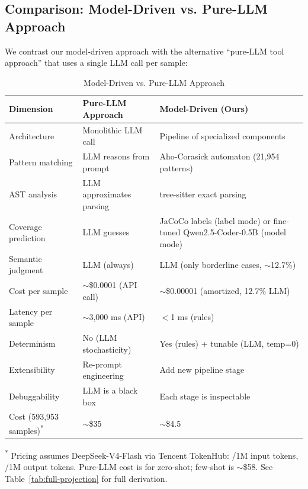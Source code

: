 \documentclass[acmlarge,nonacm,screen]{acmart}
\begin{document}
\subsection{Comparison: Model-Driven vs. Pure-LLM Approach}

We contrast our model-driven approach with the alternative ``pure-LLM tool approach'' that uses a single LLM call per sample:

\begin{table}[htbp]
\caption{Model-Driven vs. Pure-LLM Approach}
\label{tab:model-driven-vs-llm}
\begin{tabular}{@{}>{\raggedright\arraybackslash}p{3cm}>{\raggedright\arraybackslash}p{4.6cm}>{\raggedright\arraybackslash}p{5.6cm}@{}}
\toprule
\textbf{Dimension} & \textbf{Pure-LLM Approach} & \textbf{Model-Driven (Ours)} \\
\midrule
Architecture & Monolithic LLM call & Pipeline of specialized components \\
Pattern matching & LLM reasons from prompt & Aho-Corasick automaton (21,954 patterns) \\
AST analysis & LLM approximates parsing & tree-sitter exact parsing \\
Coverage prediction & LLM guesses & JaCoCo labels (label mode) or fine-tuned Qwen2.5-Coder-0.5B (model mode) \\
Semantic judgment & LLM (always) & LLM (only borderline cases, $\sim$12.7\%) \\
Cost per sample & $\sim$\$0.0001 (API call) & $\sim$\$0.00001 (amortized, 12.7\% LLM) \\
Latency per sample & $\sim$3,000 ms (API) & $<$1 ms (rules) \\
Determinism & No (LLM stochasticity) & Yes (rules) + tunable (LLM, temp=0) \\
Extensibility & Re-prompt engineering & Add new pipeline stage \\
Debuggability & LLM is a black box & Each stage is inspectable \\
Cost (593,953 samples)\textsuperscript{*} & $\sim$\$35 & $\sim$\$4.5 \\
\bottomrule
\end{tabular}
\begin{flushleft}
\small \textsuperscript{*} Pricing assumes DeepSeek-V4-Flash via Tencent
TokenHub: /1M input tokens, /1M output tokens.
Pure-LLM cost is for zero-shot; few-shot is $\sim$\$58. See
Table~\ref{tab:full-projection} for full derivation.
\end{flushleft}
\end{table}
\end{document}
